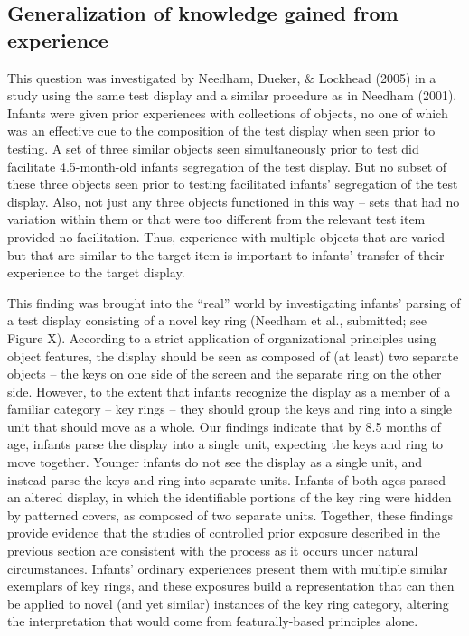 \subsection{Generalization of knowledge gained from experience}

This question was investigated by Needham, Dueker, \& Lockhead (2005)
in a study using the same test display and a similar procedure as in
Needham (2001).  Infants were given prior experiences with collections
of objects, no one of which was an effective cue to the composition of
the test display when seen prior to testing.  A set of three similar
objects seen simultaneously prior to test did facilitate 4.5-month-old
infants segregation of the test display.  But no subset of these three
objects seen prior to testing facilitated infants' segregation
of the test display.  Also, not just any three objects functioned in
this way -- sets that had no variation within them or that were
too different from the relevant test item provided no facilitation.
Thus, experience with multiple objects that are varied but that are
similar to the target item is important to infants' transfer
of their experience to the target display.



This finding was brought into the ``real'' world by investigating
infants' parsing of a test display consisting of a novel key
ring (Needham et al., submitted; see Figure X).  According to a strict
application of organizational principles using object features, the
display should be seen as composed of (at least) two separate
objects -- the keys on one side of the screen and the separate
ring on the other side.  However, to the extent that infants recognize
the display as a member of a familiar category -- key
rings -- they should group the keys and ring into a single unit
that should move as a whole.  Our findings indicate that by 8.5 months
of age, infants parse the display into a single unit, expecting the
keys and ring to move together.  Younger infants do not see the
display as a single unit, and instead parse the keys and ring into
separate units.  Infants of both ages parsed an altered display, in
which the identifiable portions of the key ring were hidden by
patterned covers, as composed of two separate units.  Together, these
findings provide evidence that the studies of controlled prior
exposure described in the previous section are consistent with the
process as it occurs under natural circumstances.  Infants'
ordinary experiences present them with multiple similar exemplars of
key rings, and these exposures build a representation that can then be
applied to novel (and yet similar) instances of the key ring category,
altering the interpretation that would come from featurally-based
principles alone.




